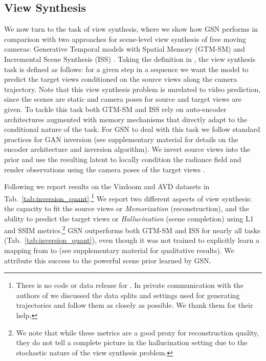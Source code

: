 \documentclass[10pt,twocolumn,letterpaper]{article}
\begin{document}
\subsection{View Synthesis}

We now turn to the task of view synthesis, where we show how GSN performs in comparison with two approaches for scene-level view synthesis of free moving cameras: Generative Temporal models with Spatial Memory (GTM-SM) \cite{gtmsm} and Incremental Scene Synthesis (ISS) \cite{iss}. Taking the definition in \cite{iss}, the view synthesis task is defined as follows: for a given step  in a sequence we want the model to predict the target  views  conditioned on the source  views  along the camera trajectory. Note that this view synthesis problem is unrelated to video prediction, since the scenes are static and camera poses for source and target views are given. To tackle this task both GTM-SM \cite{gtmsm} and ISS \cite{iss} rely on auto-encoder architectures augmented with memory mechanisms that directly adapt to the conditional nature of the task. For GSN to deal with this task we follow standard practices for GAN inversion \cite{ganinversion} (see supplementary material for details on the encoder architecture and inversion algorithm). We invert source views  into the prior and use the resulting latent to locally condition the radiance field and render observations using the camera poses of the target views .

Following \cite{iss} we report results on the Vizdoom \cite{vizdoom} and AVD \cite{avd} datasets in Tab.~\ref{tab:inversion_quant}.\footnote{There is no code or data release for \cite{iss}. In private communication with the authors of \cite{iss} we discussed the data splits and settings used for generating trajectories and follow them as closely as possible. We thank them for their help.} We report two different aspects of view synthesis: the capacity to fit the source views or \textit{Memorization} (\eg reconstruction), and the ability to predict the target views or \textit{Hallucination} (\eg scene completion) using L1 and SSIM metrics.\footnote{We note that while these metrics are a good proxy for reconstruction quality, they do not tell a complete picture in the hallucination setting due to the stochastic nature of the view synthesis problem.} GSN outperforms both GTM-SM \cite{gtmsm} and ISS \cite{iss} for nearly all tasks (Tab.~\ref{tab:inversion_quant}), even though it was not trained to explicitly learn a mapping from  to  (see supplementary material for qualitative results). We attribute this success to the powerful scene prior learned by GSN.
\end{document}
